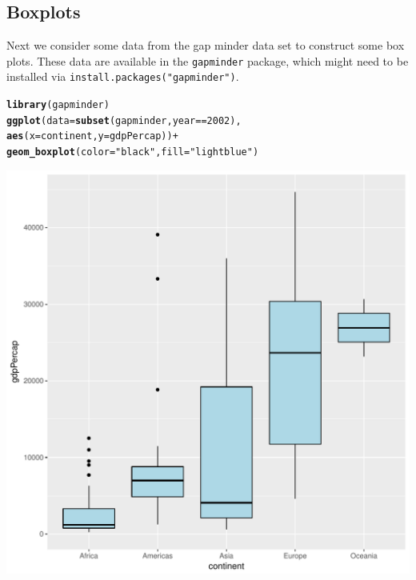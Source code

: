 \documentclass[12pt,oneside]{book}\usepackage[]{graphicx}\usepackage[]{color}
\makeatletter
\def\maxwidth{ %
  \ifdim\Gin@nat@width>\linewidth
    \linewidth
  \else
    \Gin@nat@width
  \fi
}
\newcommand{\hlnum}[1]{\textcolor[rgb]{0.686,0.059,0.569}{#1}}%
\newcommand{\hlstr}[1]{\textcolor[rgb]{0.192,0.494,0.8}{#1}}%
\newcommand{\hlopt}[1]{\textcolor[rgb]{0,0,0}{#1}}%
\newcommand{\hlstd}[1]{\textcolor[rgb]{0.345,0.345,0.345}{#1}}%
\newcommand{\hlkwc}[1]{\textcolor[rgb]{0.333,0.667,0.333}{#1}}%
\newcommand{\hlkwd}[1]{\textcolor[rgb]{0.737,0.353,0.396}{\textbf{#1}}}%
\newenvironment{kframe}{%
 \def\at@end@of@kframe{}%
 \ifinner\ifhmode%
  \def\at@end@of@kframe{\end{minipage}}%
  \begin{minipage}{\columnwidth}%
 \fi\fi%
 \def\FrameCommand##1{\hskip\@totalleftmargin \hskip-\fboxsep
 \colorbox{shadecolor}{##1}\hskip-\fboxsep
     \hskip-\linewidth \hskip-\@totalleftmargin \hskip\columnwidth}%
 \MakeFramed {\advance\hsize-\width
   \@totalleftmargin\z@ \linewidth\hsize
   \@setminipage}}%
 {\par\unskip\endMakeFramed%
 \at@end@of@kframe}
\newenvironment{knitrout}{}{} %
\makeatother
\begin{document}
\subsection{Boxplots}
Next we consider some data from the gap minder data set to construct some box plots. These data are available in the \verb+gapminder+ package, which might need to be installed via \verb+install.packages("gapminder")+.
\begin{knitrout}
\color{fgcolor}\begin{kframe}
\begin{alltt}
\hlkwd{library}\hlstd{(gapminder)}
\hlkwd{ggplot}\hlstd{(}\hlkwc{data} \hlstd{=} \hlkwd{subset}\hlstd{(gapminder,  year} \hlopt{==} \hlnum{2002}\hlstd{),}
       \hlkwd{aes}\hlstd{(}\hlkwc{x} \hlstd{= continent,} \hlkwc{y} \hlstd{= gdpPercap))} \hlopt{+}
    \hlkwd{geom_boxplot}\hlstd{(}\hlkwc{color} \hlstd{=} \hlstr{"black"}\hlstd{,} \hlkwc{fill} \hlstd{=} \hlstr{"lightblue"}\hlstd{)}
\end{alltt}
\end{kframe}
\includegraphics[width=\maxwidth]{figure/unnamed-chunk-78-1} 

\end{knitrout}
\end{document}
